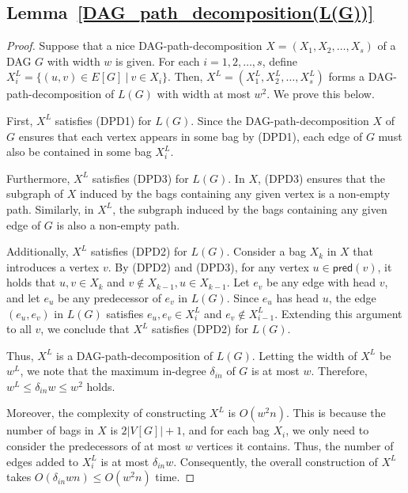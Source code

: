 \documentclass[runningheads]{llncs}
\theoremstyle{plain}
\theoremstyle{definition}
\begin{document}
\subsection{\textbf{Lemma~\ref{DAG_path_decomposition(L(G))}}}\label{appendix_B1}
\begin{proof}
    Suppose that a nice DAG-path-decomposition $X=(X_1, X_2, \dots, X_s)$ of a DAG $G$ with width $w$ is given. For each $i=1, 2, \dots, s$, define $X^L_i = \{(u, v) \in E[G]~|~v \in X_i \}$. Then, $X^L=(X^L_1, X^L_2, \dots, X^L_s)$ forms a DAG-path-decomposition of $L(G)$ with width at most $w^2$. We prove this below. 
    
    First, $X^L$ satisfies (DPD1) for $L(G)$. Since the DAG-path-decomposition $X$ of $G$ ensures that each vertex appears in some bag by (DPD1), each edge of $G$ must also be contained in some bag $X^L_i$. 
    
    Furthermore, $X^L$ satisfies (DPD3) for $L(G)$. In $X$, (DPD3) ensures that the subgraph of $X$ induced by the bags containing any given vertex is a non-empty path. Similarly, in $X^L$, the subgraph induced by the bags containing any given edge of $G$ is also a non-empty path.
    
    Additionally, $X^L$ satisfies (DPD2) for $L(G)$. Consider a bag $X_k$ in $X$ that introduces a vertex $v$. By (DPD2) and (DPD3), for any vertex $u \in \mathsf{pred}(v)$, it holds that $u, v \in X_k$ and $v \notin X_{k-1}, u \in X_{k-1}$. Let $e_v$ be any edge with head $v$, and let $e_u$ be any predecessor of $e_v$ in $L(G)$. Since $e_u$ has head $u$, the edge $(e_u, e_v)$ in $L(G)$ satisfies $e_u, e_v \in X^L_i$ and $e_v \notin X^L_{i-1}$. Extending this argument to all $v$, we conclude that $X^L$ satisfies (DPD2) for $L(G)$. 
    
    Thus, $X^L$ is a DAG-path-decomposition of $L(G)$. Letting the width of $X^L$ be $w^L$, we note that the maximum in-degree $\delta_{in}$ of $G$ is at most $w$. Therefore, $w^L \leq \delta_{in} w \leq w^2$ holds. 

    Moreover, the complexity of constructing $X^L$ is $O(w^2n)$. This is because the number of bags in $X$ is $2|V[G]|+1$, and for each bag $X_i$, we only need to consider the predecessors of at most $w$ vertices it contains. Thus, the number of edges added to $X^L_i$ is at most $\delta_{in}w$. Consequently, the overall construction of $X^L$ takes $O(\delta_{in}wn) \leq O(w^2n)$ time.
\end{proof}
\end{document}
